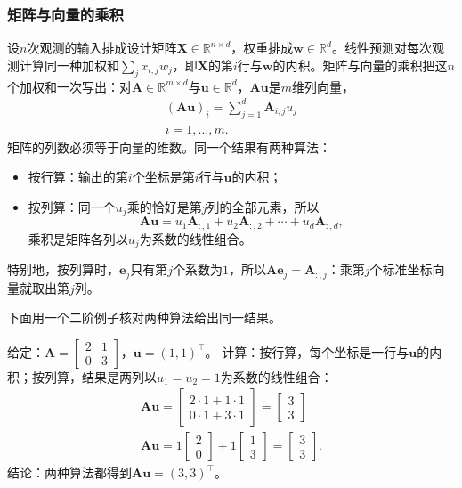 \subsubsection{矩阵与向量的乘积}
\label{sec:prelim-matrix-records-prediction}

设$n$次观测的输入排成设计矩阵$\bm X\in\mathbb R^{n\times d}$，权重排成$\bm w\in\mathbb R^d$。线性预测对每次观测计算同一种加权和$\sum_j x_{i,j}w_j$，即$\bm X$的第$i$行与$\bm w$的内积。矩阵与向量的乘积把这$n$个加权和一次写出：对$\bm A\in\mathbb R^{m\times d}$与$\bm u\in\mathbb R^d$，$\bm A\bm u$是$m$维列向量，
\begin{equation}
\begin{gathered}
(\bm A\bm u)_i=\sum_{j=1}^d\bm A_{i,j}u_j\\
i=1,\ldots,m.
\end{gathered}
\label{eq:prelim-matrix-prediction}
\end{equation}
矩阵的列数必须等于向量的维数。同一个结果有两种算法：
\begin{itemize}
 \item 按行算：输出的第$i$个坐标是第$i$行与$\bm u$的内积；
 \item 按列算：同一个$u_j$乘的恰好是第$j$列的全部元素，所以
 \[
  \bm A\bm u=u_1\bm A_{:,1}+u_2\bm A_{:,2}+\cdots+u_d\bm A_{:,d},
 \]
 乘积是矩阵各列以$u_j$为系数的线性组合。
\end{itemize}
特别地，按列算时，$\bm e_j$只有第$j$个系数为$1$，所以$\bm A\bm e_j=\bm A_{:,j}$：乘第$j$个标准坐标向量就取出第$j$列。

下面用一个二阶例子核对两种算法给出同一结果。
\begin{example}[按行与按列计算矩阵与向量的乘积]
\label{ex:ls-matrix-vector-rows-columns}
给定：$\bm A=\left[\begin{smallmatrix}2&1\\0&3\end{smallmatrix}\right]$，$\bm u=(1,1)^\top$。
计算：按行算，每个坐标是一行与$\bm u$的内积；按列算，结果是两列以$u_1=u_2=1$为系数的线性组合：
\[
\begin{gathered}
\bm A\bm u
 =\begin{bmatrix}2\cdot1+1\cdot1\\0\cdot1+3\cdot1\end{bmatrix}
 =\begin{bmatrix}3\\3\end{bmatrix}\\
\bm A\bm u=1\begin{bmatrix}2\\0\end{bmatrix}+1\begin{bmatrix}1\\3\end{bmatrix}
 =\begin{bmatrix}3\\3\end{bmatrix}.
\end{gathered}
\]
结论：两种算法都得到$\bm A\bm u=(3,3)^\top$。
\end{example}

